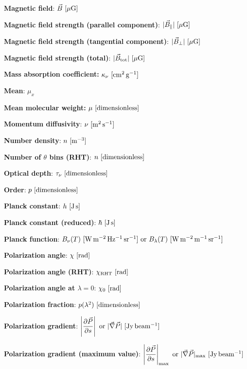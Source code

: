 \documentclass[a4paper,10pt]{article}
\begin{document}
{\noindent}\textbf{Magnetic field}: $\vec{B}~[{\rm \mu G]}$

{\noindent}\textbf{Magnetic field strength (parallel component)}: $\lvert\vec{B}_\parallel\rvert~[{\rm \mu G]}$

{\noindent}\textbf{Magnetic field strength (tangential component)}: $\lvert\vec{B}_\perp\rvert~[{\rm \mu G]}$

{\noindent}\textbf{Magnetic field strength (total)}: $\lvert\vec{B}_{\rm tot}\rvert~[{\rm \mu G]}$

{\noindent}\textbf{Mass absorption coefficient:} $\kappa_\nu ~ [{\rm cm^2\,g^{-1}}]$

{\noindent}\textbf{Mean}: $\mu_x$

{\noindent}\textbf{Mean molecular weight:} $\mu ~ [{\rm dimensionless}]$

{\noindent}\textbf{Momentum diffusivity}: $\nu ~ [{\rm m^2\,s^{-1}}]$

{\noindent}\textbf{Number density}: $n ~ [{\rm m^{-3}}]$

{\noindent}\textbf{Number of $\theta$ bins (RHT)}: $n ~ [{\rm dimensionless}]$

{\noindent}\textbf{Optical depth}: $\tau_\nu~[{\rm dimensionless}]$

{\noindent}\textbf{Order}: $p~[{\rm dimensionless}]$

{\noindent}\textbf{Planck constant}: $h~[{\rm J\,s}]$

{\noindent}\textbf{Planck constant (reduced)}: $\hbar~[{\rm J\,s}]$

{\noindent}\textbf{Planck function}: $B_\nu(T)~[{\rm W\,m^{-2}\,Hz^{-1}\,sr^{-1}}]~{\rm or}~B_\lambda(T)~[{\rm W\,m^{-2}\,m^{-1}\,sr^{-1}}]$

{\noindent}\textbf{Polarization angle}: $\chi~[{\rm rad}]$

{\noindent}\textbf{Polarization angle (RHT)}: $\chi_\mathrm{RHT} ~ [{\rm rad}]$

{\noindent}\textbf{Polarization angle at $\lambda=0$}: $\chi_0~[{\rm rad}]$

{\noindent}\textbf{Polarization fraction}: $p(\lambda^2)~[{\rm dimensionless}]$

{\noindent}\textbf{Polarization gradient}: $\left\lvert\dfrac{\partial\vec{P}}{\partial s}\right\rvert~{\rm or}~\lvert\vec\nabla\vec{P}\rvert ~ [\rm Jy\,beam^{-1}]$

{\noindent}\textbf{Polarization gradient (maximum value)}: $\left\lvert\dfrac{\partial\vec{P}}{\partial s}\right\rvert_{\rm max}~{\rm or}~\lvert\vec\nabla\vec{P}\rvert_{\rm max} ~ [\rm Jy\,beam^{-1}]$
\end{document}
